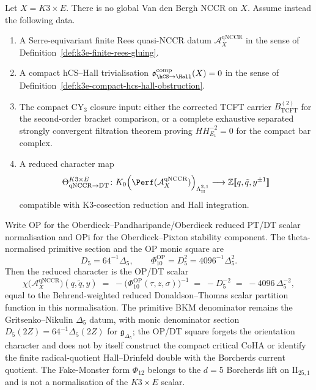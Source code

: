 \begin{proposition}
\label{thm:quasi-nccr-character-k3xE}
Let $X=K3\times E$. There is no global Van den Bergh NCCR on $X$. Assume instead the following data.
\begin{enumerate}[label=\textup{(\roman*)},leftmargin=1.5em]
\item A Serre-equivariant finite Rees quasi-NCCR datum $\mathcal A^{\mathrm{qNCCR}}_X$ in the sense of Definition~\ref{def:k3e-finite-rees-gluing}.
\item A compact hCS--Hall trivialisation $\mathfrak o_{\hCS\to\Hall}^{\mathrm{comp}}(X)=0$ in the sense of Definition~\ref{def:k3e-compact-hcs-hall-obstruction}.
\item The compact CY$_3$ closure input: either the corrected TCFT carrier $B_{\mathrm{TCFT}}^{(2)}$ for the second-order bracket comparison, or a complete exhaustive separated strongly convergent filtration theorem proving $HH^{-2}_{E_1}=0$ for the compact bar complex.
\item A reduced character map
\[
\ThetaQNCCRDT\colon
K_0\!\left(\Perf(\mathcal A^{\mathrm{qNCCR}}_X)\right)_{\Lambda^{2,1}_{\mathrm{II}}}
\longrightarrow
\mathbb Z[\![q,\tilde q,y^{\pm1}]\!]
\]
compatible with K3-cosection reduction and Hall integration.
\end{enumerate}
Write OP for the Oberdieck--Pandharipande/Oberdieck reduced PT/DT scalar normalisation and OPi for the Oberdieck--Pixton stability component. The theta-normalised primitive section and the OP monic square are
\[
 D_5=64^{-1}\Delta_5,\qquad
 \Phi_{10}^{\mathrm{OP}}=D_5^2=4096^{-1}\Delta_5^2.
\]
Then the reduced character is the OP/DT scalar
\[
 \chi\bigl(\mathcal A^{\mathrm{qNCCR}}_X\bigr)(q, \tilde q, y)
 \;=\; -\bigl(\Phi_{10}^{\mathrm{OP}}(\tau, z, \sigma)\bigr)^{-1}
 \;=\; -D_5^{-2}
 \;=\; -4096\,\Delta_5^{-2},
\]
equal to the Behrend-weighted reduced Donaldson--Thomas scalar partition function in this normalisation. The primitive BKM denominator remains the Gritsenko--Nikulin $\Delta_5$ datum, with monic denominator section $D_5(2Z)=64^{-1}\Delta_5(2Z)$ for $\mathfrak g_{\Delta_5}$; the OP/DT square forgets the orientation character and does not by itself construct the compact critical CoHA or identify the finite radical-quotient Hall--Drinfeld double with the Borcherds current quotient. The Fake-Monster form $\Phi_{12}$ belongs to the $d=5$ Borcherds lift on $\mathrm{II}_{25,1}$ and is not a normalisation of the $K3\times E$ scalar.


\end{proposition}
